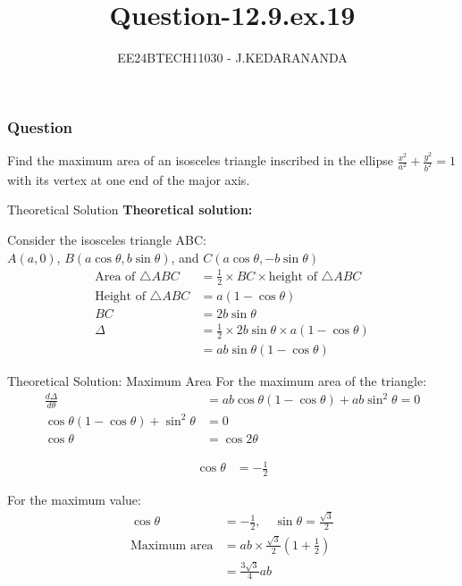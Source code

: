 \documentclass{beamer}
\title{Question-12.9.ex.19}
\author{EE24BTECH11030 - J.KEDARANANDA}
\date{}
\begin{document}
	
	\frame{\titlepage}
	
	\begin{frame}
		\frametitle{Question}
		Find the maximum area of an isosceles triangle inscribed in the ellipse $\frac{x^2}{a^2}+\frac{y^2}{b^2}=1$with its vertex at one end of the major axis.\\
	\end{frame}
	\begin{frame}{Theoretical Solution}
		\textbf{Theoretical solution:}
		
		Consider the isosceles triangle ABC: \\
		$A(a, 0)$, $B(a \cos\theta, b \sin\theta)$, and $C(a \cos\theta, -b \sin\theta)$ \\
		
		\begin{align}
			\text{Area of } \triangle ABC &= \frac{1}{2} \times BC \times \text{height of } \triangle ABC \\
			\text{Height of } \triangle ABC &= a(1 - \cos\theta) \\
			BC &= 2b \sin\theta \\
			\Delta &= \frac{1}{2} \times 2b \sin\theta \times a(1 - \cos\theta) \\
			&= ab \sin\theta (1 - \cos\theta)
		\end{align}
	\end{frame}
	\begin{frame}{Theoretical Solution: Maximum Area}
		For the maximum area of the triangle:
		\begin{align}
			\frac{d\Delta}{d\theta} &= ab \cos\theta (1 - \cos\theta) + ab \sin^2\theta = 0 \\
			\cos\theta (1 - \cos\theta) + \sin^2\theta &= 0 \\
			\cos\theta &= \cos{2\theta}
		\end{align}
		
		\begin{align}
			\cos\theta &= -\frac{1}{2}
		\end{align}
		
		For the maximum value:
		\begin{align}
			\cos\theta &= -\frac{1}{2}, \quad \sin\theta = \frac{\sqrt{3}}{2} \\
			\text{Maximum area} &= ab \times \frac{\sqrt{3}}{2} \left( 1 + \frac{1}{2} \right) \\
			&= \frac{3\sqrt{3}}{4} ab
		\end{align}
	\end{frame}
\end{document}
